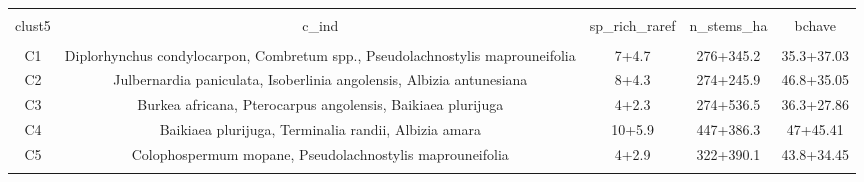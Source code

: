 
\begin{table}[!htbp] \centering 
  \caption{} 
  \label{clust_summ} 
\begin{tabular}{@{\extracolsep{5pt}} ccccc} 
\\[-1.8ex]\hline 
\hline \\[-1.8ex] 
clust5 & c\_ind & sp\_rich\_raref & n\_stems\_ha & bchave \\ 
\hline \\[-1.8ex] 
C1 & Diplorhynchus condylocarpon, Combretum spp., Pseudolachnostylis maprouneifolia & 7+4.7 & 276+345.2 & 35.3+37.03 \\ 
C2 & Julbernardia paniculata, Isoberlinia angolensis, Albizia antunesiana & 8+4.3 & 274+245.9 & 46.8+35.05 \\ 
C3 & Burkea africana, Pterocarpus angolensis, Baikiaea plurijuga & 4+2.3 & 274+536.5 & 36.3+27.86 \\ 
C4 & Baikiaea plurijuga, Terminalia randii, Albizia amara & 10+5.9 & 447+386.3 & 47+45.41 \\ 
C5 & Colophospermum mopane, Pseudolachnostylis maprouneifolia & 4+2.9 & 322+390.1 & 43.8+34.45 \\ 
\hline \\[-1.8ex] 
\end{tabular} 
\end{table} 
